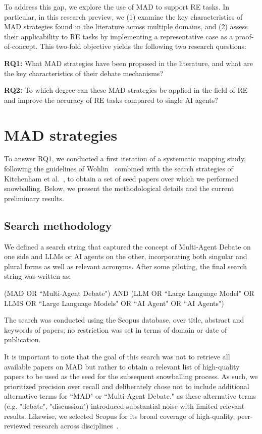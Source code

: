 \documentclass[conference]{IEEEtran}
\begin{document}
To address this gap, we explore the use of MAD to support RE tasks. In particular, in this research preview, we (1) examine the key characteristics of MAD strategies found in the literature across multiple domains, and (2) assess their applicability to RE tasks by implementing a representative case as a proof-of-concept. This two-fold objective yields the following two research questions:

\textbf{RQ1:} What MAD strategies have been proposed in the literature, and what are the key characteristics of their debate mechanisms?

\textbf{RQ2:} To which degree can these MAD strategies be applied in the field of RE and improve the accuracy of RE tasks compared to single AI agents? 

\section{MAD strategies}
\label{sec:MAD_stra}

To answer RQ1, we conducted a first iteration of a systematic mapping study, following the guidelines of Wohlin~\cite{Wohlin2014} combined with the search strategies of Kitchenham et al.~\cite{keele2007}, to obtain a set of seed papers over which we performed snowballing. Below, we present the methodological details and the current preliminary results. 

\subsection{Search methodology}
\label{sec:search-methodology}
We defined a search string that captured the concept of Multi-Agent Debate on one side and LLMs or AI agents on the other, incorporating both singular and plural forms as well as relevant acronyms. After some piloting, the final search string was written as: 

\begin{tcolorbox}
(MAD OR ``Multi-Agent Debate") AND (LLM OR ``Large Language Model" OR LLMS OR ``Large Language Models" OR ``AI Agent" OR ``AI Agents")
\end{tcolorbox}

The search was conducted using the Scopus database, over title, abstract and keywords of papers; no restriction was set in terms of domain or date of publication. 

It is important to note that the goal of this search was not to retrieve all available papers on MAD but rather to obtain a relevant list of high-quality papers to be used as the seed for the subsequent snowballing process. As such, we prioritized precision over recall and deliberately chose not to include additional alternative terms for ``MAD" or ``Multi-Agent Debate." as these alternative terms (e.g. "debate", "discussion") introduced substantial noise with limited relevant results. Likewise, we selected Scopus for its broad coverage of high-quality, peer-reviewed research across disciplines~\cite{Martín-Martín2021}.%
\end{document}
